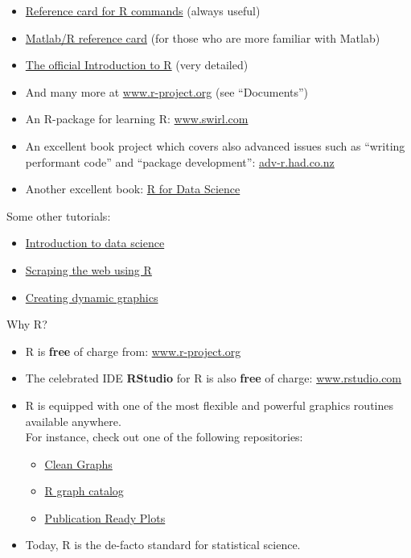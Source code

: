 \documentclass[
]{book}
\providecommand{\tightlist}{%
  \setlength{\itemsep}{0pt}\setlength{\parskip}{0pt}}
\begin{document}
\begin{itemize}
\tightlist
\item
  \href{http://cran.r-project.org/doc/contrib/refcard.pdf}{Reference card for R commands} (always useful)
\item
  \href{http://www.math.umaine.edu/~hiebeler/comp/matlabR.pdf}{Matlab/R reference card} (for those who are more familiar with Matlab)
\item
  \href{https://cran.r-project.org/doc/manuals/r-release/R-intro.pdf}{The official Introduction to R} (very detailed)
\item
  And many more at \href{https://www.r-project.org/other-docs.html}{www.r-project.org} (see ``Documents'')
\item
  An R-package for learning R: \href{https://swirlstats.com/}{www.swirl.com}
\item
  An excellent book project which covers also advanced issues such as ``writing performant code'' and ``package development'': \href{http://adv-r.had.co.nz/}{adv-r.had.co.nz}\\
\item
  Another excellent book: \href{https://r4ds.had.co.nz/}{R for Data Science}
\end{itemize}

Some other tutorials:

\begin{itemize}
\tightlist
\item
  \href{https://idc9.github.io/stor390/}{Introduction to data science}
\item
  \href{https://stat4701.github.io/edav/2015/04/02/rvest_tutorial/}{Scraping the web using R}
\item
  \href{https://gganimate.com/}{Creating dynamic graphics}
\end{itemize}

Why R?

\begin{itemize}
\tightlist
\item
  R is \textbf{free} of charge from: \href{https://www.r-project.org/}{www.r-project.org}
\item
  The celebrated IDE \textbf{RStudio} for R is also \textbf{free} of charge: \href{http://www.rstudio.com/}{www.rstudio.com}
\item
  R is equipped with one of the most flexible and powerful graphics routines available anywhere.\\
  For instance, check out one of the following repositories:

  \begin{itemize}
  \tightlist
  \item
    \href{http://shinyapps.org/apps/RGraphCompendium/index.php}{Clean Graphs}
  \item
    \href{http://shiny.stat.ubc.ca/r-graph-catalog/}{R graph catalog}
  \item
    \href{http://www.sthda.com/english/rpkgs/ggpubr/}{Publication Ready Plots}
  \end{itemize}
\item
  Today, R is the de-facto standard for statistical science.
\end{itemize}
\end{document}

